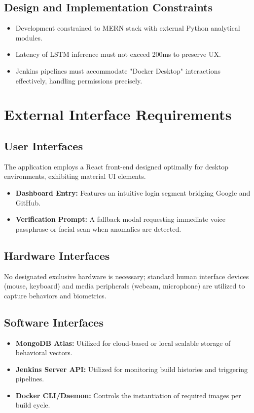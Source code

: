 \documentclass[12pt, a4paper]{article}
\begin{document}
\subsection{Design and Implementation Constraints}
\begin{itemize}
    \item Development constrained to MERN stack with external Python analytical modules.
    \item Latency of LSTM inference must not exceed 200ms to preserve UX.
    \item Jenkins pipelines must accommodate "Docker Desktop" interactions effectively, handling permissions precisely.
\end{itemize}

\newpage
\section{External Interface Requirements}
\subsection{User Interfaces}
The application employs a React front-end designed optimally for desktop environments, exhibiting material UI elements. 
\begin{itemize}
    \item \textbf{Dashboard Entry:} Features an intuitive login segment bridging Google and GitHub.
    \item \textbf{Verification Prompt:} A fallback modal requesting immediate voice passphrase or facial scan when anomalies are detected.
\end{itemize}

\subsection{Hardware Interfaces}
No designated exclusive hardware is necessary; standard human interface devices (mouse, keyboard) and media peripherals (webcam, microphone) are utilized to capture behaviors and biometrics.

\subsection{Software Interfaces}
\begin{itemize}
    \item \textbf{MongoDB Atlas:} Utilized for cloud-based or local scalable storage of behavioral vectors.
    \item \textbf{Jenkins Server API:} Utilized for monitoring build histories and triggering pipelines.
    \item \textbf{Docker CLI/Daemon:} Controls the instantiation of required images per build cycle.
\end{itemize}
\end{document}
